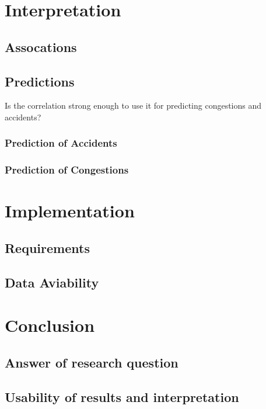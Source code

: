 \documentclass[a4paper,12pt]{report}
\begin{document}
\chapter{Interpretation}

\section{Assocations}

\section{Predictions}
Is the correlation strong enough to use it for predicting congestions and accidents?

\subsection{Prediction of Accidents}

\subsection{Prediction of Congestions}

\chapter{Implementation}

\section{Requirements}

\section{Data Aviability}

\chapter{Conclusion}

\section{Answer of research question}

\section{Usability of results and interpretation}
\end{document}
